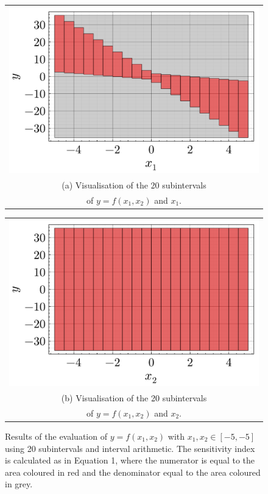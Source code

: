 \documentclass[twocolumn]{rps-esrel2022}
\begin{document}
\begin{figure}
	\centering
	\begin{tabular}{@{}c@{}}
	  \includegraphics[width=\linewidth]{figures/example_boxes_1.pdf} \\[\abovecaptionskip]
	  \small (a) Visualisation of the 20 subintervals\\
	  \small of $y=f(x_1,x_2)$ and $x_1$.
	\end{tabular}

	\vspace{\floatsep}

	\begin{tabular}{@{}c@{}}
	  \includegraphics[width=\linewidth]{figures/example_boxes_2.pdf} \\[\abovecaptionskip]
	  \small (b) Visualisation of the 20 subintervals\\
	  \small of $y=f(x_1,x_2)$ and $x_2$.
	\end{tabular}

	\caption{Results of the evaluation of $y=f(x_1,x_2)$ with $x_1,x_2 \in [-5,-5]$ using 20 subintervals and interval arithmetic.
	The sensitivity index is calculated as in Equation 1, where the numerator is equal to the area coloured in red and the denominator
	equal to the area coloured in grey.}
	\label{fig:myfig}
\end{figure}
\end{document}
